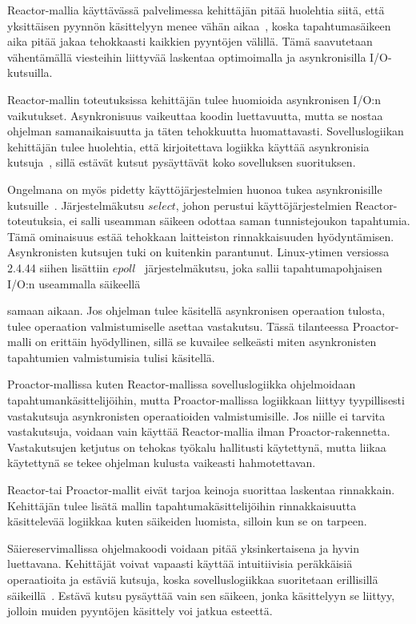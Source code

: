 \documentclass[finnish]{tktltiki2}%
\theoremstyle{definition}
\theoremstyle{remark}
\begin{document}
Reactor-mallia käyttävässä palvelimessa kehittäjän
pitää huolehtia siitä, että yksittäisen pyynnön
käsittelyyn menee vähän aikaa~\cite{schmidt_reactor:_1995}, koska
tapahtumasäikeen aika pitää jakaa tehokkaasti
kaikkien pyyntöjen välillä. Tämä saavutetaan
vähentämällä viesteihin liittyvää laskentaa optimoimalla ja
asynkronisilla I/O-kutsuilla.

Reactor-mallin toteutuksissa kehittäjän tulee huomioida
asynkronisen I/O:n vaikutukset. Asynkronisuus vaikeuttaa koodin
luettavuutta, mutta se nostaa ohjelman samanaikaisuutta ja täten
tehokkuutta huomattavasti. Sovelluslogiikan kehittäjän
tulee huolehtia, että kirjoitettava logiikka
käyttää asynkronisia kutsuja~\cite{schmidt_reactor:_1995}, sillä estävät
kutsut pysäyttävät koko sovelluksen suorituksen.

Ongelmana on myös pidetty käyttöjärjestelmien huonoa
tukea asynkronisille kutsuille~\cite{pyarali_proactor_1997}. Järjestelmäkutsu
$select$, johon perustui käyttöjärjestelmien Reactor-toteutuksia,
ei salli useamman säikeen odottaa saman tunnistejoukon tapahtumia.
Tämä ominaisuus estää tehokkaan laitteiston rinnakkaisuuden hyödyntämisen.
Asynkronisten kutsujen tuki on kuitenkin parantunut.
Linux-ytimen versiossa
2.4.44 siihen lisättiin $epoll$~\cite{man_epoll} järjestelmäkutsu, joka
sallii tapahtumapohjaisen I/O:n useammalla säikeellä

samaan aikaan.
Jos ohjelman tulee käsitellä
asynkronisen operaation tulosta, tulee operaation valmistumiselle
asettaa vastakutsu. 
Tässä tilanteessa Proactor-malli on erittäin hyödyllinen, sillä se
kuvailee selkeästi miten asynkronisten tapahtumien valmistumisia tulisi käsitellä.

Proactor-mallissa kuten Reactor-mallissa sovelluslogiikka ohjelmoidaan
tapahtumankäsittelijöihin, mutta Proactor-mallissa logiikkaan liittyy
tyypillisesti vastakutsuja 
asynkronisten operaatioiden valmistumisille. Jos 
niille ei tarvita vastakutsuja,
voidaan vain käyttää Reactor-mallia ilman Proactor-rakennetta.
Vastakutsujen ketjutus on tehokas työkalu hallitusti käytettynä,
mutta liikaa käytettynä se tekee ohjelman kulusta vaikeasti
hahmotettavan.

Reactor-tai Proactor-mallit eivät tarjoa keinoja
suorittaa laskentaa rinnakkain. Kehittäjän tulee lisätä
mallin tapahtumakäsittelijöihin rinnakkaisuutta käsittelevää
logiikkaa kuten säikeiden luomista, silloin kun se on tarpeen.

Säiereservimallissa ohjelmakoodi voidaan pitää yksinkertaisena ja
hyvin luettavana. Kehittäjät voivat vapaasti käyttää intuitiivisia
peräkkäisiä operaatioita ja estäviä kutsuja, koska sovelluslogiikkaa
suoritetaan erillisillä säikeillä~\cite{hu_applying_1998}. Estävä kutsu pysäyttää vain
sen säikeen, jonka käsittelyyn se liittyy, jolloin muiden
pyyntöjen käsittely voi jatkua esteettä.
\end{document}
